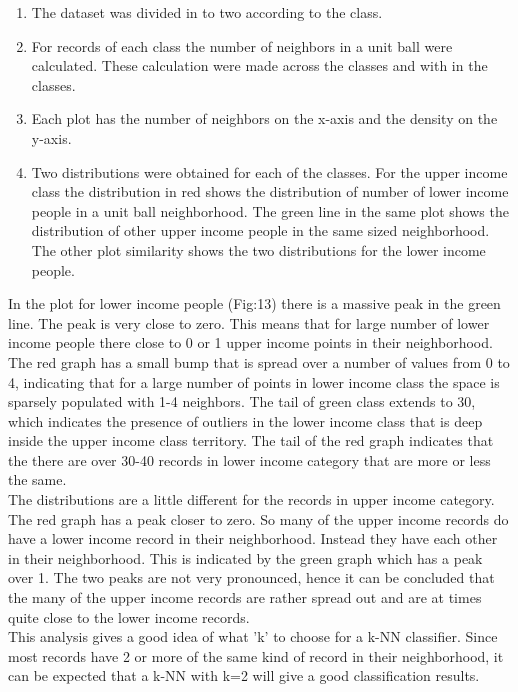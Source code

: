 \begin{enumerate}
\item The dataset was divided in to two according to the class.
\item For records of each class the number of neighbors in a unit ball were calculated. These calculation were made across the classes and with in the classes.
\item Each plot has the number of neighbors on the x-axis and the density on the y-axis.
\item Two distributions were obtained for each of the classes. For the upper income class the distribution in red shows the distribution of number of lower income people in a unit ball neighborhood. The green line in the same plot shows the distribution of other upper income people in the same sized neighborhood. The other plot similarity shows the two distributions for the lower income people.
\end{enumerate}

In the plot for lower income people (Fig:13) there is a massive peak in the green line. The peak is very close to zero. This means that for large number of lower income people there close to 0 or 1 upper income points in their neighborhood. The red graph has a small bump that is spread over a number of values from 0 to 4, indicating that for a large number of points in lower income class the space is sparsely populated with 1-4 neighbors. The tail of green class extends to 30, which indicates the presence of outliers in the lower income class that is deep inside the upper income class territory. The tail of the red graph indicates that the there are over 30-40 records in lower income category that are more or less the same.\\
The distributions are a little different for the records in upper income category. The red graph has a peak closer to zero. So many of the upper income records do have a lower income record in their neighborhood. Instead they have each other in their neighborhood. This is indicated by the green graph which has a peak over 1. The two peaks are not very pronounced, hence it can be concluded that the many of the upper income records are rather spread out and are at times quite close to the lower income records.\\

This analysis gives a good idea of what 'k' to choose for a k-NN classifier. Since most records have 2 or more of the same kind of record in their neighborhood, it can be expected that a k-NN with k=2 will give a good classification results.\\
